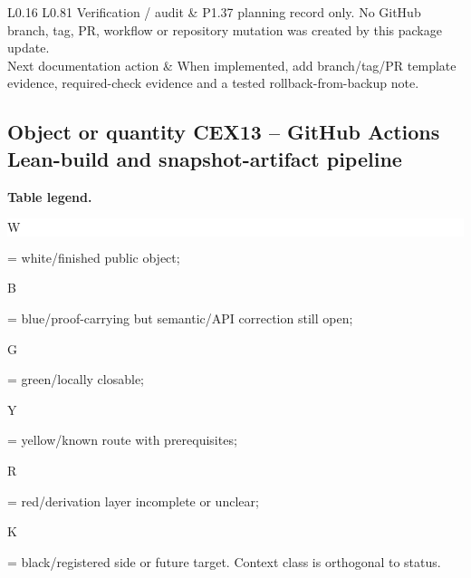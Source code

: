 \begin{longtable}{L{0.16\linewidth} L{0.81\linewidth}}
\hline\addlinespace[0.20em]
Verification /\allowbreak{} audit & P1.37 planning record only. No GitHub branch, tag, PR, workflow or repository mutation was created by this package update.\\
\hline\addlinespace[0.20em]
Next documentation action & When implemented, add branch/\allowbreak{}tag/\allowbreak{}PR template evidence, required-check evidence and a tested rollback-from-backup note.\\
\hline\addlinespace[0.20em]
\end{longtable}
\subsection*{Object or quantity CEX13 -- GitHub Actions Lean-build and snapshot-artifact pipeline}
\hypertarget{objproof:CEX13}{}
\par\smallskip\noindent\begin{minipage}{0.99\linewidth}\footnotesize\raggedright\textbf{Table legend.} \colorbox{white}{\strut W} = white/finished public object; \colorbox{cyan!20}{\strut B} = blue/proof-carrying but semantic/API correction still open; \colorbox{green!18}{\strut G} = green/locally closable; \colorbox{yellow!25}{\strut Y} = yellow/known route with prerequisites; \colorbox{red!20}{\strut R} = red/derivation layer incomplete or unclear; \colorbox{black!18}{\strut K} = black/registered side or future target. Context class is orthogonal to status.\end{minipage}\par\vspace{0.25em}
